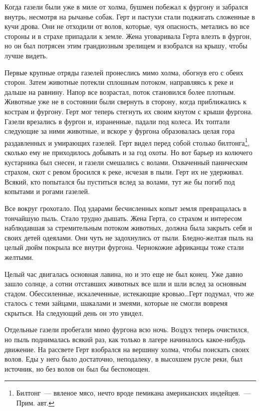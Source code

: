 \documentclass[12pt,a4paper,twoside,openany,svgnames]{memoir}
\begin{document}
Когда газели были уже в миле от холма, бушмен побежал к фургону и забрался внутрь, несмотря на рычанье собак. Герт и пастухи стали поджигать сложенные в кучи дрова. Они не отходили от волов, которые, чуя опасность, метались во все стороны и в страхе припадали к земле. Жена уговаривала Герта влезть в фургон, но он был потрясен этим грандиозным зрелищем и взобрался на крышу, чтобы лучше видеть.

Первые крупные отряды газелей пронеслись мимо холма, обогнув его с обеих сторон. Затем животные потекли сплошным потоком, направляясь к реке и дальше на равнину. Напор все возрастал, поток становился более плотным. Животные уже не в состоянии были свернуть в сторону, когда приближались к кострам и фургону. Герт мог теперь стегнуть их своим кнутом с крыши фургона. Газели врезались в фургон и, израненные, падали под колеса. Их топтали следующие за ними животные, и вскоре у фургона образовалась целая гора раздавленных и умирающих газелей. Герт видел перед собой столько билтонга\footnote{Билтонг~--- вяленое мясо, нечто вроде пемикана американских индейцев.~--- Прим. авт.}, сколько ему не приходилось добывать и за год охоты. Но вот барьер из колючего кустарника был снесен, и газели смешались с волами. Охваченный паническим страхом, скот с ревом бросился к реке, исчезая в пыли. Герт их не удерживал. Всякий, кто попытался бы пуститься вслед за волами, тут же бы погиб под копытами и рогами газелей.

Все вокруг грохотало. Под ударами бесчисленных копыт земля превращалась в тончайшую пыль. Стало трудно дышать. Жена Герта, со страхом и интересом наблюдавшая за стремительным потоком животных, должна была закрыть себя и своих детей одеялами. Они чуть не задохнулись от пыли. Бледно-желтая пыль на целый дюйм покрыла все внутри фургона. Чернокожие африканцы тоже стали желтыми.

Целый час двигалась основная лавина, но и это еще не был конец. Уже давно зашло солнце, а сотни отставших животных все шли и шли вслед за основным стадом. Обессиленные, искалеченные, истекающие кровью\ldots Герт подумал, что же сталось с теми зайцами, шакалами и змеями, которые не смогли вовремя скрыться. На следующий день он это увидел.

Отдельные газели пробегали мимо фургона всю ночь. Воздух теперь очистился, но пыль поднималась всякий раз, как только в лагере начиналось какое-нибудь движение. На рассвете Герт взобрался на вершину холма, чтобы поискать своих волов. Еды у него было достаточно, неподалеку, в высохшем русле реки, был источник, но без волов он был бы беспомощен.
\end{document}
